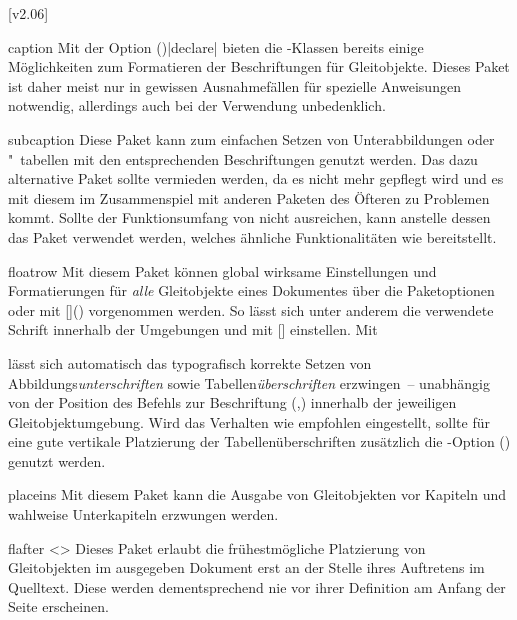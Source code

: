 [v2.06]
%
%
\begin{packages}
\item[caption]
  Mit der Option ()|declare| bieten 
  die \KOMAScript-Klassen bereits einige Möglichkeiten zum Formatieren der 
  Beschriftungen für Gleitobjekte. Dieses Paket ist daher meist nur in gewissen 
  Ausnahmefällen für spezielle Anweisungen notwendig, allerdings auch bei der 
  Verwendung unbedenklich.
\item[subcaption]
  Diese Paket kann zum einfachen Setzen von Unterabbildungen oder "~tabellen 
  mit den entsprechenden Beschriftungen genutzt werden. Das dazu alternative 
  Paket  sollte vermieden werden, da es nicht mehr gepflegt 
  wird und es mit diesem im Zusammenspiel mit anderen Paketen des Öfteren zu 
  Problemen kommt. Sollte der Funktionsumfang von  nicht 
  ausreichen, kann anstelle dessen das Paket  verwendet 
  werden, welches ähnliche Funktionalitäten wie  bereitstellt.
\item[floatrow]
  Mit diesem Paket können global wirksame Einstellungen und Formatierungen für 
  \emph{alle} Gleitobjekte eines Dokumentes über die Paketoptionen oder mit 
  [\PParameter{\dots}]() vorgenommen 
  werden. So lässt sich unter anderem die verwendete Schrift innerhalb der 
  Umgebungen  und  mit
  [] einstellen. Mit 
  \begin{Code}
  \end{Code}\vspace{-\baselineskip}%
  lässt sich automatisch das typografisch korrekte Setzen von 
  Abbildungs\emph{unterschriften} sowie Tabellen\emph{überschriften} 
  erzwingen~-- unabhängig von der Position des Befehls zur Beschriftung 
  (,) innerhalb der 
  jeweiligen Gleitobjektumgebung. Wird das Verhalten wie empfohlen eingestellt, 
  sollte für eine gute vertikale Platzierung der Tabellenüberschriften 
  zusätzlich die \KOMAScript-Option 
  () genutzt werden.
\item[placeins]
  Mit diesem Paket kann die Ausgabe von Gleitobjekten vor Kapiteln und wahlweise
  Unterkapiteln erzwungen werden.
\item[flafter]<>
  Dieses Paket erlaubt die frühestmögliche Platzierung von Gleitobjekten im 
  ausgegeben Dokument erst an der Stelle ihres Auftretens im Quelltext. Diese 
  werden dementsprechend nie vor ihrer Definition am Anfang der Seite 
  erscheinen.
\end{packages}
%



